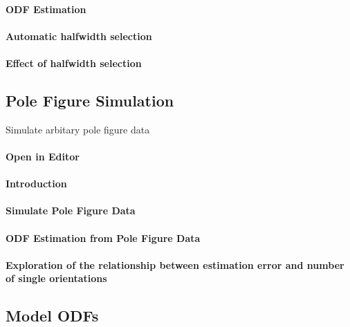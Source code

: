 \documentclass{article}
\begin{document}
			\paragraph{ODF Estimation}
		
			\paragraph{Automatic halfwidth selection}
		
			\paragraph{Effect of halfwidth selection}
		
		\subsection{Pole Figure Simulation}

		
                     \begin{par}
Simulate arbitary pole figure data
\end{par} \vspace{1em}

                  
			\paragraph{Open in Editor}
		
			\paragraph{Introduction}
		
			\paragraph{Simulate Pole Figure Data}
		
			\paragraph{ODF Estimation from Pole Figure Data}
		
			\paragraph{Exploration of the relationship between estimation error and number of single orientations}
		
		\subsection{Model ODFs}
\end{document}
